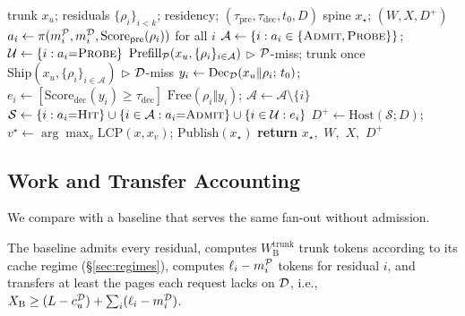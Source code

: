 \begin{algorithm}[t]
\caption{\sys{} fan-out.
$\pi$ is \eqref{eq:action}; $(W,X,d_i)$ follow \eqref{eq:work}--\eqref{eq:dec}.
$\mathrm{Host}$ is any decode-time pruner.}
\label{alg:app}
\small
\begin{algorithmic}[1]
\REQUIRE trunk $x_u$; residuals $\{\rho_i\}_{i{<}k}$; residency; $(\tau_{\mathrm{pre}},\tau_{\mathrm{dec}},t_0,D)$
\ENSURE spine $x_\star$; $(W,X,D^{+})$
\STATE $a_i\leftarrow\pi(m_i^{\mathcal{P}},m_i^{\mathcal{D}},\mathrm{Score}_{\mathrm{pre}}(\rho_i))$ for all $i$
\STATE $\mathcal{A}\leftarrow\{i:a_i\in\{\textsc{Admit},\textsc{Probe}\}\}$;\;
  $\mathcal{U}\leftarrow\{i:a_i{=}\textsc{Probe}\}$
\STATE $\mathrm{Prefill}_{\mathcal{P}}(x_u,\{\rho_i\}_{i\in\mathcal{A}})$ \hfill \(\triangleright\) $\mathcal{P}$-miss; trunk once
\STATE $\mathrm{Ship}(x_u,\{\rho_i\}_{i\in\mathcal{A}})$ \hfill \(\triangleright\) $\mathcal{D}$-miss
  \STATE $y_i\leftarrow\mathrm{Dec}_{\mathcal{D}}(x_u\Vert\rho_i;\,t_0)$;\;
    $e_i\leftarrow[\mathrm{Score}_{\mathrm{dec}}(y_i)\ge\tau_{\mathrm{dec}}]$
    \STATE $\mathrm{Free}(\rho_i\Vert y_i)$;\; $\mathcal{A}\leftarrow\mathcal{A}\setminus\{i\}$
  \ENDIF
\ENDFOR
\STATE $\mathcal{S}\leftarrow\{i:a_i{=}\textsc{Hit}\}\cup\{i\in\mathcal{A}:a_i{=}\textsc{Admit}\}\cup\{i\in\mathcal{U}:e_i\}$
\STATE $D^{+}\leftarrow\mathrm{Host}(\mathcal{S};D)$;\;
  $v^\star\leftarrow\arg\max_v\mathrm{LCP}(x,x_v)$;\;
  $\mathrm{Publish}(x_\star)$
\STATE \textbf{return} $x_\star$,\ $W$,\ $X$,\ $D^{+}$
\end{algorithmic}
\end{algorithm}

\subsection{Work and Transfer Accounting}
\label{sec:accounting}

We compare \sys with a baseline that serves the same fan-out without admission.

\begin{assumption}[Baseline]
\label{ass:baseline}
The baseline admits every residual, computes $W_{\mathrm{B}}^{\mathrm{trunk}}$ trunk tokens according to its cache regime (\S\ref{sec:regimes}), computes $\ell_i-m_i^{\mathcal{P}}$ tokens for residual $i$, and transfers at least the pages each request lacks on $\mathcal{D}$, i.e., $X_{\mathrm{B}}\ge(L-c_u^{\mathcal{D}})+\sum_i(\ell_i-m_i^{\mathcal{D}})$.
\end{assumption}

